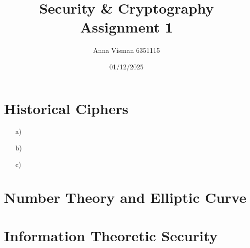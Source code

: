 \documentclass[10pt, oneside]{article}
\title{Security \& Cryptography Assignment 1}
\author{Anna Visman 6351115}
\date{01/12/2025}
\begin{document}
\maketitle

\section{Historical Ciphers}

\begin{itemize}
    \item[a)]
    \item[b)] 
    \item[c)] 
\end{itemize}

\section{Number Theory and Elliptic Curve}

\section{Information Theoretic Security}
\end{document}
